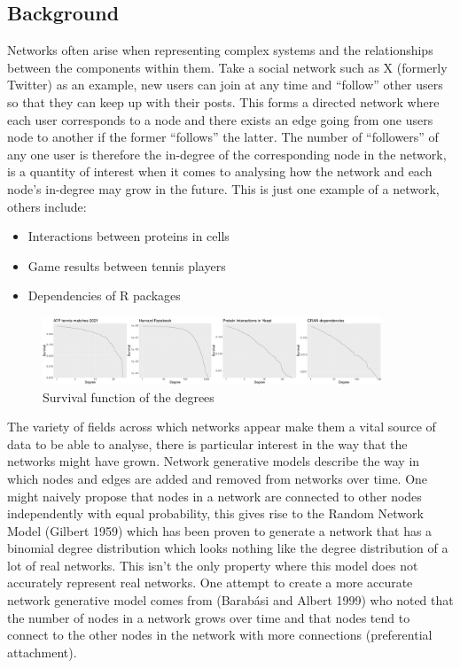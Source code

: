 \documentclass[
]{article}
\begin{document}
\hypertarget{sec-bg}{%
\subsection{Background}\label{sec-bg}}

Networks often arise when representing complex systems and the
relationships between the components within them. Take a social network
such as X (formerly Twitter) as an example, new users can join at any
time and ``follow'' other users so that they can keep up with their
posts. This forms a directed network where each user corresponds to a
node and there exists an edge going from one users node to another if
the former ``follows'' the latter. The number of ``followers'' of any
one user is therefore the in-degree of the corresponding node in the
network, is a quantity of interest when it comes to analysing how the
network and each node's in-degree may grow in the future. This is just
one example of a network, others include:

\begin{itemize}
\item
  Interactions between proteins in cells
\item
  Game results between tennis players
\item
  Dependencies of R packages
\end{itemize}

\begin{figure}[H]

{\centering \includegraphics[width=0.9\textwidth,height=\textheight]{proposal_files/figure-pdf/fig-survs-1.pdf}

}

\caption{\label{fig-survs}Survival function of the degrees}

\end{figure}

The variety of fields across which networks appear make them a vital
source of data to be able to analyse, there is particular interest in
the way that the networks might have grown. Network generative models
describe the way in which nodes and edges are added and removed from
networks over time. One might naively propose that nodes in a network
are connected to other nodes independently with equal probability, this
gives rise to the Random Network Model (Gilbert 1959) which has been
proven to generate a network that has a binomial degree distribution
which looks nothing like the degree distribution of a lot of real
networks. This isn't the only property where this model does not
accurately represent real networks. One attempt to create a more
accurate network generative model comes from (Barabási and Albert 1999)
who noted that the number of nodes in a network grows over time and that
nodes tend to connect to the other nodes in the network with more
connections (preferential attachment).
\end{document}
